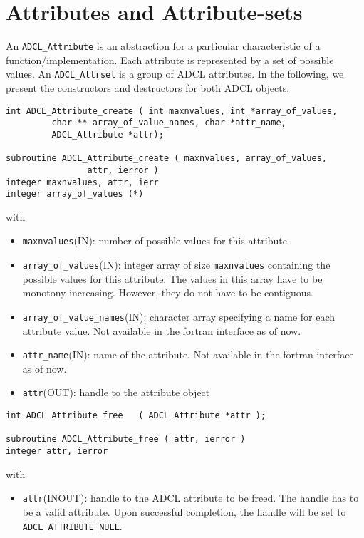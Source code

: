 \section{Attributes and Attribute-sets}

An {\tt ADCL\_Attribute} is an abstraction for a particular characteristic of
a function/implementation. Each attribute is represented by a set of possible
values.  An {\tt ADCL\_Attrset} is a group of ADCL attributes.  In the
following, we present the constructors and destructors for both ADCL objects.

\begin{verbatim}
int ADCL_Attribute_create ( int maxnvalues, int *array_of_values, 
         char ** array_of_value_names, char *attr_name, 
         ADCL_Attribute *attr);

subroutine ADCL_Attribute_create ( maxnvalues, array_of_values, 
                attr, ierror )
integer maxnvalues, attr, ierr
integer array_of_values (*)
\end{verbatim}
with
\begin{itemize}
\item {\tt maxnvalues}(IN): number of possible values for this attribute
\item {\tt array\_of\_values}(IN): integer array of size {\tt maxnvalues} containing the possible values for this 
  attribute. The values in this array have to be monotony increasing. However, they do not have to be contiguous.
\item {\tt array\_of\_value\_names}(IN): character array specifying a name for
  each attribute value. Not available in the fortran interface as of now.
\item {\tt attr\_name}(IN): name of the attribute. Not available in the
  fortran interface as of now.
\item {\tt attr}(OUT): handle to the attribute object
\end{itemize} 	

\hspace{1cm}
\begin{verbatim}
int ADCL_Attribute_free   ( ADCL_Attribute *attr );

subroutine ADCL_Attribute_free ( attr, ierror )
integer attr, ierror
\end{verbatim}
with
\begin{itemize}
\item {\tt attr}(INOUT): handle to the ADCL attribute to be freed. The handle has to be a valid attribute.
    	Upon successful completion, the handle will be set to {\tt ADCL\_ATTRIBUTE\_NULL}.
\end{itemize}

